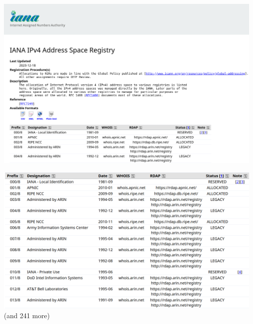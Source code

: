 \begin{frame}{}
\includegraphics[width=\textwidth]{../arp/iana-registry-screenshot}
\end{frame}

\begin{frame}{}
\includegraphics[width=\textwidth]{../arp/iana-ipv4-allocs}
(and 241 more)
\end{frame}

